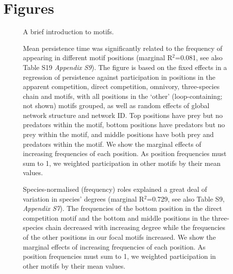 \documentclass[12pt]{article}
\begin{document}




\clearpage

\section*{Figures}

    \begin{figure}[ht!]
        \caption{A brief introduction to motifs.}
        \label{motifs}
    \end{figure}

    \clearpage


    \begin{figure}[ht!]
        \centering
        \caption{Mean persistence time was significantly related to the frequency of appearing in different motif positions (marginal R$^2$=0.081, see also Table S19 \emph{Appendix S9}). The figure is based on the fixed effects in a regression of persistence against participation in positions in the apparent competition, direct competition, omnivory, three-species chain and motifs, with all positions in the `other' (loop-containing; not shown) motifs grouped, as well as random effects of global network structure and network ID. Top positions have prey but no predators within the motif, bottom positions have predators but no prey within the motif, and middle positions have both prey and predators within the motif. We show the marginal effects of increasing frequencies of each position. As position frequencies must sum to 1, we weighted participation in other motifs by their mean values.}
        \label{fig:persistence_positions}
    \end{figure}

    \clearpage


    \begin{figure}[ht!]
        \centering
        \caption{Species-normalised (frequency) roles explained a great deal of variation in species' degrees (marginal R$^2$=0.729, see also Table S9, \emph{Appendix S7}). The frequencies of the bottom position in the direct competition motif and the bottom and middle positions in the three-species chain decreased with increasing degree while the frequencies of the other positions in our focal motifs increased. We show the marginal effects of increasing frequencies of each position. As position frequencies must sum to 1, we weighted participation in other motifs by their mean values.}
        \label{fig:positions_deg}
    \end{figure}
\end{document}
